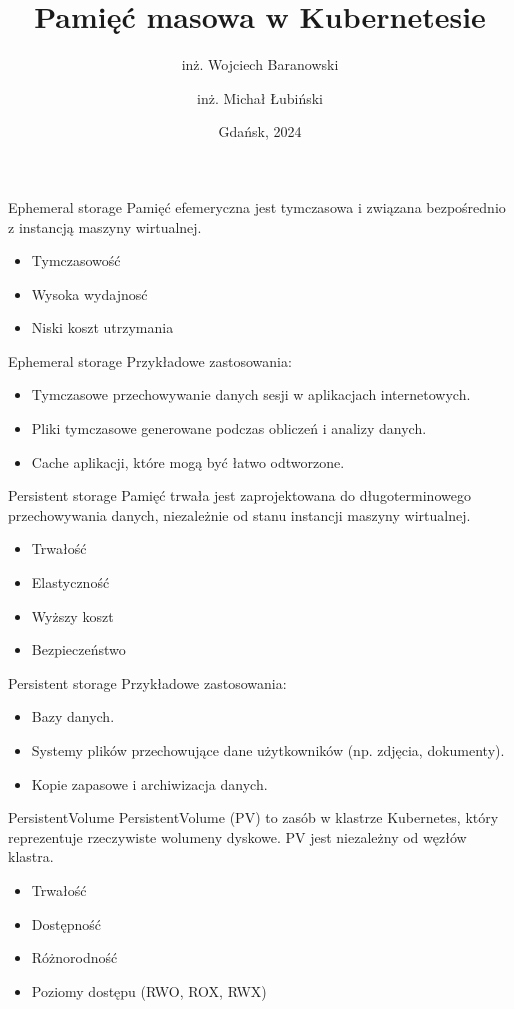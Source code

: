 \documentclass[polish,envcountsect,10pt]{beamer}
\title{Pamięć masowa w Kubernetesie}
\author{inż. Wojciech Baranowski \and inż. Michał Łubiński}
\date{Gdańsk, 2024}
\begin{document}
\frame{\titlepage}

\begin{frame}{Ephemeral storage}
	Pamięć efemeryczna jest tymczasowa i związana bezpośrednio z instancją maszyny wirtualnej.
	\begin{itemize}
		\item Tymczasowość
		\item Wysoka wydajnosć
		\item Niski koszt utrzymania
	\end{itemize}
\end{frame}

\begin{frame}{Ephemeral storage}
	Przykładowe zastosowania:
	\begin{itemize}
    	\item Tymczasowe przechowywanie danych sesji w aplikacjach internetowych.
    	\item Pliki tymczasowe generowane podczas obliczeń i analizy danych.
    	\item Cache aplikacji, które mogą być łatwo odtworzone.
	\end{itemize}
\end{frame}

\begin{frame}{Persistent storage}
	Pamięć trwała jest zaprojektowana do długoterminowego przechowywania danych, niezależnie od stanu instancji maszyny wirtualnej.
	\begin{itemize}
		\item Trwałość
		\item Elastyczność
		\item Wyższy koszt
		\item Bezpieczeństwo
	\end{itemize}
\end{frame}

\begin{frame}{Persistent storage}
	Przykładowe zastosowania:
	\begin{itemize}
    	\item Bazy danych.
   		\item Systemy plików przechowujące dane użytkowników (np. zdjęcia, dokumenty).
    	\item Kopie zapasowe i archiwizacja danych.
	\end{itemize}
\end{frame}

\begin{frame}{PersistentVolume}
	PersistentVolume (PV) to zasób w klastrze Kubernetes, który reprezentuje rzeczywiste wolumeny dyskowe. PV jest niezależny od węzłów klastra.
	\begin{itemize}
		\item Trwałość
		\item Dostępność
		\item Różnorodność
		\item Poziomy dostępu (RWO, ROX, RWX)
	\end{itemize}
\end{frame}
\end{document}
